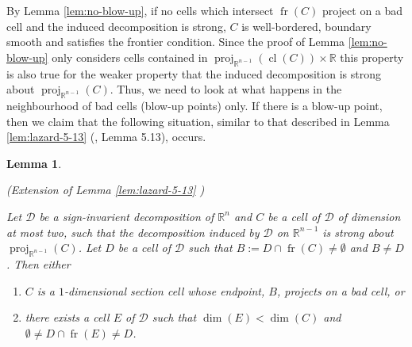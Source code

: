 \documentclass[
]{book}
\newtheorem{lemma}{Lemma}[chapter]
\theoremstyle{definition}
\theoremstyle{definition}
\theoremstyle{definition}
\theoremstyle{definition}
\theoremstyle{remark}
\begin{document}
By Lemma \ref{lem:no-blow-up}, if no cells which intersect \({\operatorname{fr} \left( C \right)}\) project on a bad cell and the induced decomposition is strong, \(C\) is well-bordered, boundary smooth and satisfies the frontier condition. Since the proof of Lemma \ref{lem:no-blow-up} only considers cells contained in \({\operatorname{proj}_{\mathbb{R}^{n-1}}}({\operatorname{cl} \left( C \right)}) \times \mathbb{R}\) this property is also true for the weaker property that the induced decomposition is strong about \({\operatorname{proj}_{\mathbb{R}^{n-1}}}(C)\).
Thus, we need to look at what happens in the neighbourhood of bad cells (blow-up points) only.
If there is a blow-up point, then we claim that the following situation, similar to that described in Lemma \ref{lem:lazard-5-13} (\citet{lazard10}, Lemma 5.13), occurs.

\begin{lemma}
\protect\hypertarget{lem:ext-lazard-5-13}{}\label{lem:ext-lazard-5-13}

(Extension of Lemma \ref{lem:lazard-5-13} \citep[Proposition 5.13]{lazard10})

Let \(\mathcal{D}\) be a sign-invarient decomposition of \(\mathbb{R}^n\) and \(C\) be a cell of \(\mathcal{D}\) of dimension at most two, such that the decomposition induced by \(\mathcal{D}\) on \(\mathbb{R}^{n-1}\) is strong about \({\operatorname{proj}_{\mathbb{R}^{n-1}}}(C)\). Let \(D\) be a cell of \(\mathcal{D}\) such that \(B := D \cap {\operatorname{fr} \left(  C  \right)} \neq \emptyset\) and \(B \neq D\). Then either

\begin{enumerate}
\def\labelenumi{\arabic{enumi}.}
\item
  \(C\) is a \(1\)-dimensional section cell whose endpoint, \(B\), projects on a bad cell, or
\item
  there exists a cell \(E\) of \(\mathcal{D}\) such that \(\dim(E) < \dim(C)\) and \(\emptyset \neq D \cap {\operatorname{fr} \left(  E  \right)} \neq D\).
\end{enumerate}

\end{lemma}
\end{document}
